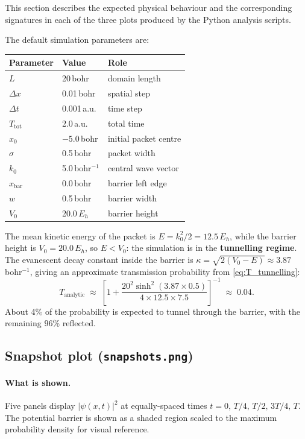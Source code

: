 \documentclass[12pt, a4paper]{article}
\newcommand{\dt}{\Delta t}
\newcommand{\dx}{\Delta x}
\begin{document}
This section describes the expected physical behaviour and the
corresponding signatures in each of the three plots produced by the
Python analysis scripts.

The default simulation parameters are:
\begin{center}
\begin{tabular}{lll}
\hline
Parameter & Value & Role \\
\hline
$L$ & 20\,bohr & domain length \\
$\dx$ & 0.01\,bohr & spatial step \\
$\dt$ & 0.001\,a.u. & time step \\
$T_\text{tot}$ & 2.0\,a.u. & total time \\
$x_0$ & $-5.0$\,bohr & initial packet centre \\
$\sigma$ & 0.5\,bohr & packet width \\
$k_0$ & 5.0\,bohr$^{-1}$ & central wave vector \\
$x_\text{bar}$ & 0.0\,bohr & barrier left edge \\
$w$ & 0.5\,bohr & barrier width \\
$V_0$ & 20.0\,$E_h$ & barrier height \\
\hline
\end{tabular}
\end{center}

The mean kinetic energy of the packet is $E = k_0^2/2 = 12.5\,E_h$, while
the barrier height is $V_0 = 20.0\,E_h$, so $E < V_0$: the simulation is
in the \textbf{tunnelling regime}.  The evanescent decay constant inside
the barrier is $\kappa = \sqrt{2(V_0-E)} \approx 3.87$\,bohr$^{-1}$,
giving an approximate transmission probability from
\eqref{eq:T_tunnelling}:
\begin{equation}
  T_\text{analytic} \;\approx\;
  \left[1 + \frac{20^2\sinh^2(3.87\times 0.5)}{4\times 12.5\times 7.5}
  \right]^{-1}
  \;\approx\; 0.04.
  \label{eq:T_predicted}
\end{equation}
About 4\% of the probability is expected to tunnel through the barrier,
with the remaining 96\% reflected.

\subsection{Snapshot plot (\texttt{snapshots.png})}

\paragraph{What is shown.}
Five panels display $|\psi(x,t)|^2$ at equally-spaced times
$t = 0,\, T/4,\, T/2,\, 3T/4,\, T$.
The potential barrier is shown as a shaded region scaled to the
maximum probability density for visual reference.
\end{document}
